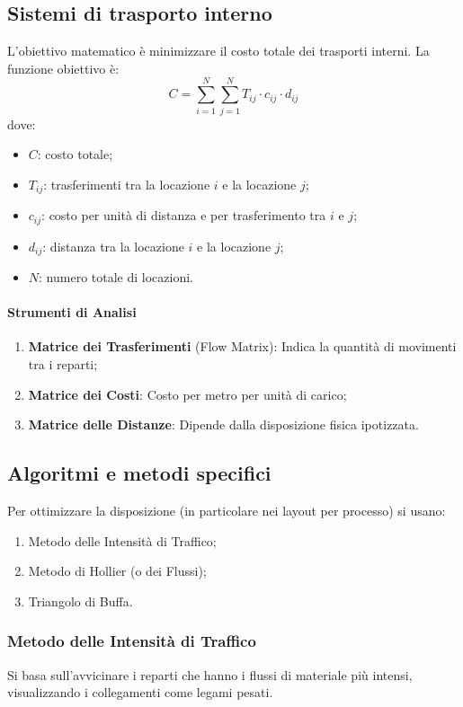 \subsection{Sistemi di trasporto interno} L'obiettivo matematico è minimizzare il costo totale dei trasporti interni. La funzione obiettivo è:
\[
    C = \sum_{i=1}^{N} \sum_{j=1}^{N} T_{ij} \cdot c_{ij} \cdot d_{ij}
\]
dove:
\begin{itemize}
    \item $ C $: costo totale;
    \item $ T_{ij} $: trasferimenti tra la locazione $ i $ e la locazione $ j $;
    \item $ c_{ij} $: costo per unità di distanza e per trasferimento tra $ i $ e $ j $;
    \item $ d_{ij} $: distanza tra la locazione $ i $ e la locazione $ j $;
    \item $ N $: numero totale di locazioni.
\end{itemize}
%
\paragraph{Strumenti di Analisi}
\begin{enumerate}
    \item \textbf{Matrice dei Trasferimenti} (Flow Matrix): Indica la quantità di movimenti tra i reparti;
    \item \textbf{Matrice dei Costi}: Costo per metro per unità di carico;
    \item \textbf{Matrice delle Distanze}: Dipende dalla disposizione fisica ipotizzata.
\end{enumerate}
%
\subsection{Algoritmi e metodi specifici}
Per ottimizzare la disposizione (in particolare nei layout per processo) si usano:
\begin{enumerate}[label=\alph*)] %
    \item Metodo delle Intensità di Traffico;
    \item Metodo di Hollier (o dei Flussi);
    \item Triangolo di Buffa.
\end{enumerate}

\subsubsection{Metodo delle Intensità di Traffico} Si basa sull'avvicinare i reparti che hanno i flussi di materiale più intensi, visualizzando i collegamenti come legami pesati.
